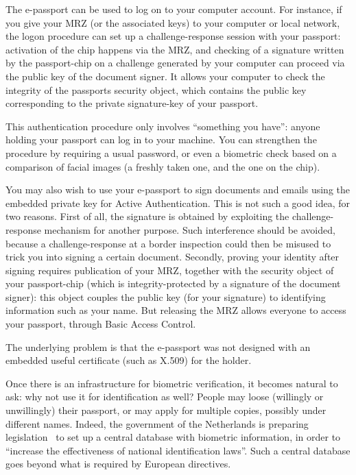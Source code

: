 \documentclass[runningheads,envcountsame,envcountsect,oribibl]{llncs}
\begin{document}
The e-passport can be used to log on to your computer account.  For
instance, if you give your MRZ (or the associated keys) to your
computer or local network, the logon procedure can set up a
challenge-response session with your passport: activation of the chip
happens via the MRZ, and checking of a signature written by the
passport-chip on a challenge generated by your computer can proceed
via the public key of the document signer. It allows your computer to
check the integrity of the passports security object, which contains
the public key corresponding to the private signature-key of your
passport.

This authentication procedure only involves ``something you have'':
anyone holding your passport can log in to your machine. You can
strengthen the procedure by requiring a usual password, or even a
biometric check based on a comparison of facial images (a freshly
taken one, and the one on the chip).

You may also wish to use your e-passport to sign documents and
emails using the embedded private key for Active Authentication. 
This is not such a good idea, for two reasons.
First of all, the signature is obtained by exploiting the challenge-response
mechanism for another purpose. Such interference should be avoided,
because a challenge-response at a border inspection could then be
misused to trick you into signing a certain document.
Secondly, proving your identity after signing requires publication of your MRZ,
together with the security object of your passport-chip (which is
integrity-protected by a signature of the document signer): this
object couples the public key (for your signature) to identifying
information such as your name. But releasing the MRZ allows everyone
to access your passport, through Basic Access Control.

The underlying problem is that the e-passport was not designed with an
embedded useful certificate (such as X.509) for the holder. 




Once there is an infrastructure for biometric verification, it becomes
natural to ask: why not use it for identification as well? People may
loose (willingly or unwillingly) their passport, or may apply for
multiple copies, possibly under different names. Indeed, the
government of the Netherlands is preparing
legislation~\cite{TK25764-26,TK29754-5} to set up a
central database with biometric information, in order to ``increase
the effectiveness of national identification laws''. Such a central
database goes beyond what is required by European directives.
\end{document}
